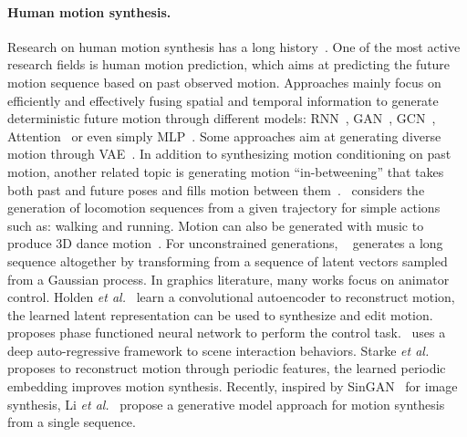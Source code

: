 \documentclass[10pt,twocolumn,letterpaper]{article}
\begin{document}
\paragraph{Human motion synthesis.} Research on human motion synthesis has a long history~\cite{badler1993simulating}. One of the most active research fields is human motion prediction, which aims at predicting the future motion sequence based on past observed motion. Approaches mainly focus on efficiently and effectively fusing spatial and temporal information to generate deterministic future motion through different models: RNN~\cite{fragkiadaki2015recurrent,martinez2017human,butepage2017deep,pavllo2018quaternet}, GAN~\cite{hernandez2019human,barsoum2018hp}, GCN~\cite{mao2019learning}, Attention~\cite{mao2020history}
 or even simply MLP~\cite{guo2022back,bouazizi2022motionmixer,du2023avatars}. Some approaches aim at generating diverse motion through VAE~\cite{habibie2017recurrent,yan2018mt,aliakbarian2020stochastic}. In addition to synthesizing motion conditioning on past motion, another related topic is generating motion “in-betweening” that takes both past and future poses and fills motion between them~\cite{harvey2018recurrent,kaufmann2020convolutional,harvey2020robust,duan2021single,tang2022real}.~\cite{pavllo2018quaternet} considers the generation of locomotion sequences from a given trajectory for simple actions such as: walking and running. Motion can also be generated with music to produce 3D dance motion~\cite{lee2019dancing,li2020learning,li2021ai,aristidou2021rhythm,chen2021choreomaster,siyao2022bailando}. For unconstrained generations,  ~\cite{yan2019convolutional} generates a long sequence altogether by transforming from a sequence of latent vectors sampled from a Gaussian process. In graphics literature, many works focus on animator control. Holden \textit{et al.}~\cite{holden2016deep} learn a convolutional autoencoder to reconstruct motion, the learned latent representation can be used to synthesize and edit motion.~\cite{holden2017phase} proposes phase functioned neural network to perform the control task.~\cite{starke2019neural} uses a deep auto-regressive framework to scene interaction behaviors. Starke \textit{et al.}~\cite{starke2022deepphase} proposes to reconstruct motion through periodic features, the learned periodic embedding improves motion synthesis. Recently, inspired by SinGAN~\cite{shaham2019singan} for image synthesis, Li \textit{et al.}~\cite{li2022ganimator} propose a generative model approach for motion synthesis from a single sequence.
\end{document}
